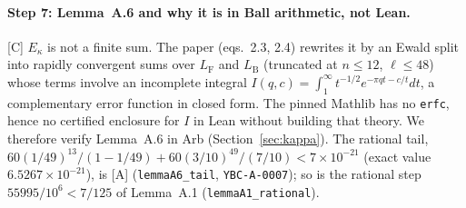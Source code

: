 \documentclass[11pt]{article}
\newcommand{\tier}[1]{\textsf{[#1]}}
\newcommand{\tA}{\tier{A}}
\newcommand{\tC}{\tier{C}}
\newcommand{\lean}[1]{\texttt{#1}}
\newcommand{\LF}{L_{\mathrm F}}
\newcommand{\LB}{L_{\mathrm B}}
\begin{document}
\paragraph{Step 7: Lemma~A.6 and why it is in Ball arithmetic, not Lean.}\tC{} $E_\kappa$ is not a finite sum. The paper (eqs.\ 2.3, 2.4) rewrites it by an Ewald split into rapidly convergent sums over $\LF$ and $\LB$ (truncated at $n\le12$, $\ell\le48$) whose terms involve an incomplete integral $I(q,c)=\int_1^\infty t^{-1/2}e^{-\pi qt-c/t}dt$, a complementary error function in closed form. The pinned Mathlib has no \lean{erfc}, hence no certified enclosure for $I$ in Lean without building that theory. We therefore verify Lemma~A.6 in Arb (Section~\ref{sec:kappa}). The rational tail, $60(1/49)^{13}/(1-1/49)+60(3/10)^{49}/(7/10)<7\times10^{-21}$ (exact value $6.5267\times10^{-21}$), is \tA{} (\lean{lemmaA6\_tail}, \texttt{YBC-A-0007}); so is the rational step $55995/10^6<7/125$ of Lemma~A.1 (\lean{lemmaA1\_rational}).

\end{document}
